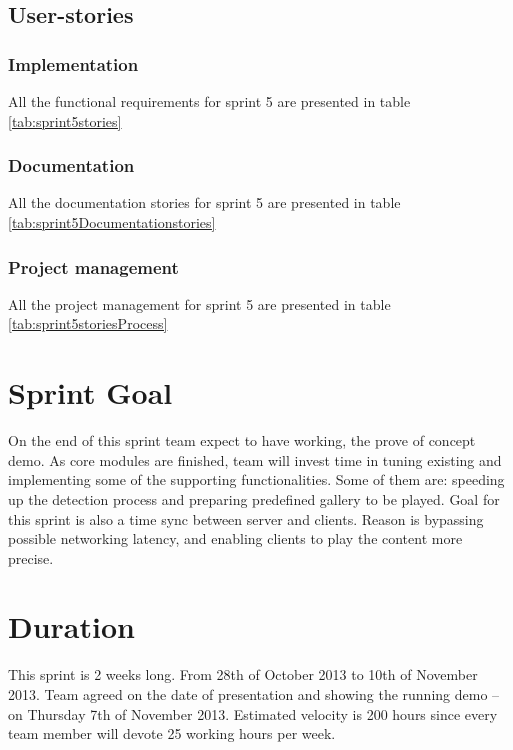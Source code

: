 \subsection{User-stories}
\subsubsection*{Implementation}
All the functional requirements for sprint 5 are presented in table \ref{tab:sprint5stories}

\subsubsection*{Documentation}
All the documentation stories for sprint 5 are presented in table \ref{tab:sprint5Documentationstories}

\subsubsection*{Project management}
All the project management for sprint 5 are presented in table \ref{tab:sprint5storiesProcess}



\section{Sprint Goal}

On the end of this sprint team expect to have working, the prove of concept demo. As core modules are finished, team will invest time in tuning existing and implementing some of the supporting functionalities. Some of them are: speeding up the detection process  and preparing predefined gallery to be played. Goal for this sprint is also a time sync between server and clients. Reason is bypassing possible networking latency, and enabling clients to play the content more precise. 

\section{Duration}
This sprint is 2 weeks long. From 28th of October 2013 to 10th of November 2013. 
Team agreed on the date of presentation and showing the running demo – on Thursday 7th of November 2013.
Estimated velocity is 200 hours since every team member will devote 25 working hours per week.

